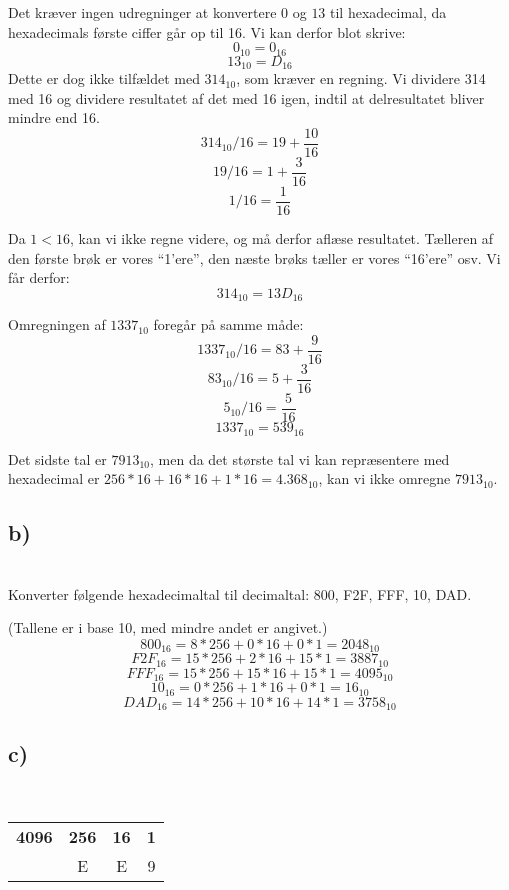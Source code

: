 \documentclass[a4paper,11pt]{article}
\newcommand{\tb}[1]{\textbf{#1}\\}
\begin{document}
Det kræver ingen udregninger at konvertere $0$ og $13$ til hexadecimal, da hexadecimals første ciffer går op til 16. Vi kan derfor blot skrive: 
$$0_{10} = 0_{16}$$
$$13_{10} = D_{16}$$
Dette er dog ikke tilfældet med $314_{10}$, som kræver en regning. Vi dividere 314 med 16 og dividere resultatet af det med 16 igen, indtil at delresultatet bliver mindre end 16.
$$314_{10}/16 = 19 + \frac{10}{16}$$
$$19/16 = 1 + \frac{3}{16}$$
$$1/16 = \frac{1}{16}$$

Da $1 < 16$, kan vi ikke regne videre, og må derfor aflæse resultatet. Tælleren af den første brøk er vores ``1'ere'', den næste brøks tæller er vores ``16'ere'' osv. Vi får derfor:
$$314_{10} = 13D_{16}$$

Omregningen af $1337_{10}$ foregår på samme måde:
$$1337_{10}/16 = 83 + \frac{9}{16}$$
$$83_{10}/16 = 5 + \frac{3}{16}$$
$$5_{10}/16 = \frac{5}{16}$$
$$1337_{10} = 539_{16}$$

Det sidste tal er $7913_{10}$, men da det største tal vi kan repræsentere med hexadecimal er $256*16+16*16+1*16 = 4.368_{10}$, kan vi ikke omregne $7913_{10}$.

\subsection*{b)}
\tb{}

Konverter følgende hexadecimaltal til decimaltal: 800, F2F, FFF, 10, DAD. 

(Tallene er i base 10, med mindre andet er angivet.)
$$ 800_{16} = 8*256 + 0 * 16 + 0 * 1 = 2048_{10}$$
$$ F2F_{16} = 15 * 256 + 2 * 16 + 15 * 1 = 3887_{10}$$
$$ FFF_{16} = 15 * 256 + 15 * 16 + 15 * 1 = 4095_{10}$$
$$ 10_{16} = 0* 256 + 1 * 16 + 0 * 1 = 16_{10}$$
$$ DAD_{16} = 14 * 256 + 10 * 16 + 14 * 1 = 3758_{10}$$

\subsection*{c)}
\tb{}

\begin{center}
  \begin{tabular}{| c | c | c | c |}
    \hline
     \textbf{4096} & \textbf{256} & \textbf{16} & \textbf{1}\\ \hline
    1 & E & E & 9\\
    \hline
  \end{tabular}
\end{center}
\end{document}
